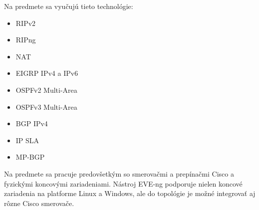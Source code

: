 Na predmete sa vyučujú tieto technológie:

\begin{itemize}
    \item RIPv2
    \item RIPng
    \item NAT
    \item EIGRP IPv4 a IPv6
    \item OSPFv2 Multi-Area
    \item OSPFv3 Multi-Area
    \item BGP IPv4
    \item IP SLA
    \item MP-BGP
\end{itemize}

Na predmete sa pracuje predovšetkým so smerovačmi a prepínačmi Cisco a fyzickými koncovými zariadeniami. Nástroj EVE-ng podporuje nielen koncové zariadenia na platforme Linux a Windows, ale do topológie je možné integrovať aj rôzne Cisco smerovače.